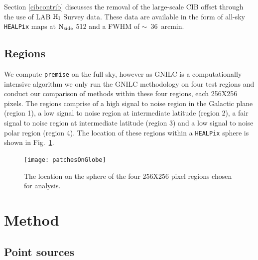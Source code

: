 \documentclass[a4paper,fleqn,usenatbib]{mnras}
\begin{document}
Section \ref{cibcontrib} discusses the removal of the large-scale CIB offset through the use of LAB $\rm{H_{I}}$ Survey data. These data are available in the form of all-sky {\texttt{HEALPix}} maps \citep{healpix} at $\rm{N_{side}}$ 512 and a FWHM of \mbox{$\sim$ 36 arcmin}. \footnotemark
{}

\subsection{Regions}

We compute {\texttt{premise}} on the full sky, however as GNILC is a computationally intensive algorithm we only run the GNILC methodology on four test regions and conduct our comparison of methods within these four regions, each 256X256 pixels. The regions comprise of a high signal to noise region in the Galactic plane (region 1), a low signal to noise region at intermediate latitude (region 2), a fair signal to noise region at intermediate latitude (region 3) and a low signal to noise polar region (region 4). The location of these regions within a {\texttt{HEALPix}} sphere is shown in Fig.~\ref{fig:globe}. 

\begin{figure}
\centering
\texttt{[image: patchesOnGlobe]}
\caption{The location on the sphere of the four 256X256 pixel regions chosen for analysis.}
\label{fig:globe}
\end{figure}

\section{Method}
\label{sec:method}
\subsection{Point sources} \label{scontrib}
\end{document}
